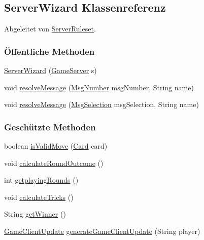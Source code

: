 \hypertarget{a00069}{\subsection{Server\-Wizard Klassenreferenz}
\label{a00069}
}


Abgeleitet von \hyperlink{a00068}{Server\-Ruleset}.

\subsubsection*{Öffentliche Methoden}
\begin{DoxyCompactItemize}
\item 
\hypertarget{a00069_a43e18699cde5f39f7a07428c6846044c}{\hyperlink{a00069_a43e18699cde5f39f7a07428c6846044c}{Server\-Wizard} (\hyperlink{a00072}{Game\-Server} s)}\label{a00069_a43e18699cde5f39f7a07428c6846044c}

\item 
void \hyperlink{a00069_ab81696440ded730e339029a5423bd17f}{resolve\-Message} (\hyperlink{a00048}{Msg\-Number} msg\-Number, String name)
\item 
void \hyperlink{a00069_a2942b8a23a70ac5f8654690b7e3cfc09}{resolve\-Message} (\hyperlink{a00050}{Msg\-Selection} msg\-Selection, String name)
\end{DoxyCompactItemize}
\subsubsection*{Geschützte Methoden}
\begin{DoxyCompactItemize}
\item 
boolean \hyperlink{a00069_aa58080772a961e1f9f88d766777f82ed}{is\-Valid\-Move} (\hyperlink{a00054}{Card} card)
\item 
\hypertarget{a00069_aceebbbc4dd4d00fe4e4086be6acda2d7}{void \hyperlink{a00069_aceebbbc4dd4d00fe4e4086be6acda2d7}{calculate\-Round\-Outcome} ()}\label{a00069_aceebbbc4dd4d00fe4e4086be6acda2d7}

\item 
int \hyperlink{a00069_a2f51687eb56bb1a10058b2c1cc2d421e}{getplaying\-Rounds} ()
\item 
\hypertarget{a00069_a0e9e22cb0e4021e9b0fff0aa0dba1499}{void \hyperlink{a00069_a0e9e22cb0e4021e9b0fff0aa0dba1499}{calculate\-Tricks} ()}\label{a00069_a0e9e22cb0e4021e9b0fff0aa0dba1499}

\item 
\hypertarget{a00069_a159081d6eb49d67e8fe72bc03a47c336}{String \hyperlink{a00069_a159081d6eb49d67e8fe72bc03a47c336}{get\-Winner} ()}\label{a00069_a159081d6eb49d67e8fe72bc03a47c336}

\item 
\hyperlink{a00059}{Game\-Client\-Update} \hyperlink{a00069_ae26f0271bee2539ca4acd6b646ad895a}{generate\-Game\-Client\-Update} (String player)
\end{DoxyCompactItemize}
